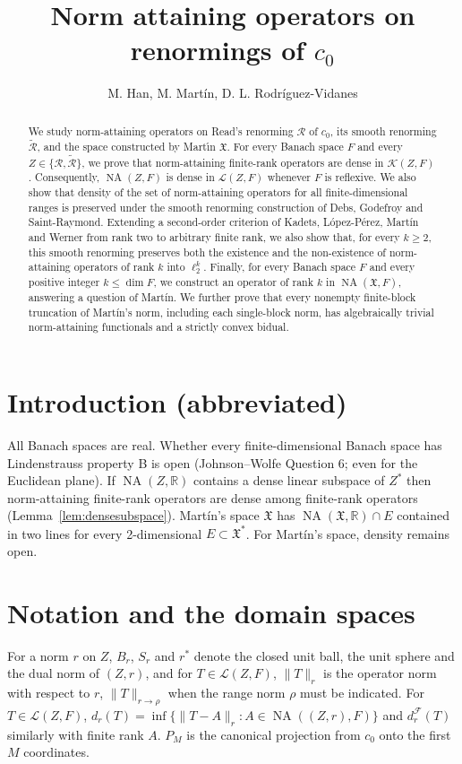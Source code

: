 \documentclass[10pt]{amsart}
\title{Norm attaining operators on renormings of $c_0$}
\author{M. Han, M. Mart\'in, D. L. Rodr\'iguez-Vidanes}
\theoremstyle{remark}
\newcommand{\K}{\mathcal K}
\newcommand{\Fin}{\mathcal{F}}
\newcommand{\R}{\mathbb{R}}
\newcommand{\Read}{\mathcal{R}}
\newcommand{\sRead}{\widetilde{\mathcal{R}}}
\newcommand{\X}{\mathfrak{X}}
\newcommand{\NA}{\operatorname{NA}}
\newcommand{\Lin}{\mathcal{L}}
\begin{document}
\begin{abstract}
We study norm-attaining operators on Read's renorming $\Read$ of $c_0$, its smooth renorming $\sRead$, and the space constructed by Mart\'{\i}n $\X$. For every Banach space $F$ and every $Z\in\{\Read, \sRead\}$, we prove that norm-attaining finite-rank operators are dense in $\K(Z,F)$. Consequently, $\NA(Z,F)$ is dense in $\Lin(Z,F)$ whenever $F$ is reflexive. We also show that density of the set of norm-attaining operators for all finite-dimensional ranges is preserved under the smooth renorming construction of Debs, Godefroy and Saint-Raymond. Extending a second-order criterion of Kadets, L\'opez-P\'erez, Mart\'in and Werner from rank two to arbitrary finite rank, we also show that, for every $k\geq2$, this smooth renorming preserves both the existence and the non-existence of norm-attaining operators of rank $k$ into $\ell_2^k$. Finally, for every Banach space $F$ and every positive integer $k\le\dim F$, we construct an operator of rank $k$ in $\NA(\X,F)$, answering a question of Mart\'in. We further prove that every nonempty finite-block truncation of Mart\'in's norm, including each single-block norm, has algebraically trivial norm-attaining functionals and a strictly convex bidual.
\end{abstract}
\maketitle

\section{Introduction (abbreviated)}
All Banach spaces are real. Whether every finite-dimensional Banach space has Lindenstrauss property B is open (Johnson--Wolfe Question 6; even for the Euclidean plane). If $\NA(Z,\R)$ contains a dense linear subspace of $Z^*$ then norm-attaining finite-rank operators are dense among finite-rank operators (Lemma~\ref{lem:densesubspace}). Mart\'in's space $\X$ has $\NA(\X,\R)\cap E$ contained in two lines for every 2-dimensional $E\subset \X^*$. For Mart\'in's space, density remains open.

\section{Notation and the domain spaces}\label{sec:prelim}
For a norm $r$ on $Z$, $B_r$, $S_r$ and $r^*$ denote the closed unit ball, the unit sphere and the dual norm of $(Z,r)$, and for $T\in\Lin(Z,F)$, $\|T\|_r$ is the operator norm with respect to $r$, $\|T\|_{r\to\rho}$ when the range norm $\rho$ must be indicated. For $T\in\Lin(Z,F)$,
$d_r(T)=\inf\{\|T-A\|_r: A\in\NA((Z,r),F)\}$ and $d_r^\Fin(T)$ similarly with finite rank $A$. $P_M$ is the canonical projection from $c_0$ onto the first $M$ coordinates.
\end{document}
